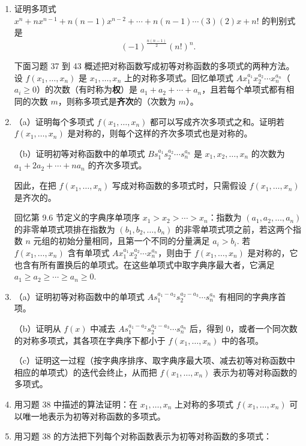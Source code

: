 \begin{enumerate}
\item 证明多项式 \(x^n+nx^{n-1}+n(n-1)x^{n-2}+\cdots+n(n-1)\cdots(3)(2)x+n!\) 的判别式是
\[
(-1)^{\frac{n(n-1)}{2}}(n!)^n.
\]

\noindent 下面习题 37 到 43 概述把对称函数写成初等对称函数的多项式的两种方法。设 \(f(x_1, \ldots, x_n)\) 是 \(x_1, \ldots, x_n\) 上的对称多项式。回忆单项式 \(Ax_1^{a_1}x_2^{a_2}\cdots x_n^{a_n}\)（\(a_i \geq 0\)）的次数（有时称为\textbf{权}）是 \(a_1+a_2+\cdots+a_n\)，且若每个单项式都有相同的次数 \(m\)，则称多项式是\textbf{齐次}的（次数为 \(m\)）。

\item （a）证明每个多项式 \(f(x_1, \ldots, x_n)\) 都可以写成齐次多项式之和。证明若 \(f(x_1, \ldots, x_n)\) 是对称的，则每个这样的齐次多项式也是对称的。

（b）证明初等对称函数中的单项式 \(Bs_1^{a_1}s_2^{a_2}\cdots s_n^{a_n}\) 是 \(x_1, x_2, \ldots, x_n\) 的次数为 \(a_1+2a_2+\cdots+na_n\) 的齐次多项式。

因此，在把 \(f(x_1, \ldots, x_n)\) 写成对称函数的多项式时，只需假设 \(f(x_1, \ldots, x_n)\) 是齐次的。

\noindent 回忆第 9.6 节定义的字典序单项序 \(x_1 > x_2 > \cdots > x_n\)：指数为 \((a_1, a_2, \ldots, a_n)\) 的非零单项式项排在指数为 \((b_1, b_2, \ldots, b_n)\) 的非零单项式项之前，若这两个指数 \(n\) 元组的初始分量相同，且第一个不同的分量满足 \(a_i > b_i\). 若 \(f(x_1, \ldots, x_n)\) 含有单项式 \(Ax_1^{a_1}x_2^{a_2}\cdots x_n^{a_n}\)，则由于 \(f(x_1, \ldots, x_n)\) 是对称的，它也含有所有置换后的单项式。在这些单项式中取字典序最大者，它满足 \(a_1 \geq a_2 \geq \cdots \geq a_n \geq 0\).

\item （a）证明初等对称函数中的单项式 \(As_1^{a_1-a_2}s_2^{a_2-a_3}\cdots s_n^{a_n}\) 有相同的字典序首项。

（b）证明从 \(f(x)\) 中减去 \(As_1^{a_1-a_2}s_2^{a_2-a_3}\cdots s_n^{a_n}\) 后，得到 0，或者一个同次数的对称多项式，其各项在字典序下都小于 \(f(x_1, \ldots, x_n)\) 中的各项。

（c）证明这一过程（按字典序排序、取字典序最大项、减去初等对称函数中相应的单项式）的迭代会终止，从而把 \(f(x_1, \ldots, x_n)\) 表示为初等对称函数的多项式。

\item 用习题 38 中描述的算法证明：在 \(x_1, \ldots, x_n\) 上对称的多项式 \(f(x_1, \ldots, x_n)\) 可以唯一地表示为初等对称函数的多项式。

\item 用习题 38 的方法把下列每个对称函数表示为初等对称函数的多项式：


\end{enumerate}
